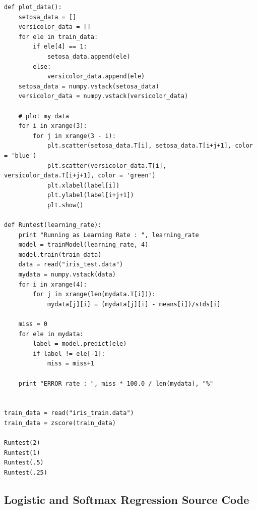 \documentclass{article} %
\begin{document}
\begin{lstlisting}[frame=single]
def plot_data():   
    setosa_data = []
    versicolor_data = []
    for ele in train_data:
        if ele[4] == 1:
            setosa_data.append(ele)
        else:
            versicolor_data.append(ele)
    setosa_data = numpy.vstack(setosa_data)
    versicolor_data = numpy.vstack(versicolor_data)

    # plot my data
    for i in xrange(3):
        for j in xrange(3 - i):
            plt.scatter(setosa_data.T[i], setosa_data.T[i+j+1], color = 'blue')
            plt.scatter(versicolor_data.T[i], versicolor_data.T[i+j+1], color = 'green')
            plt.xlabel(label[i])
            plt.ylabel(label[i+j+1])
            plt.show()

def Runtest(learning_rate):
    print "Running as Learning Rate : ", learning_rate
    model = trainModel(learning_rate, 4)
    model.train(train_data)
    data = read("iris_test.data")
    mydata = numpy.vstack(data)
    for i in xrange(4):
        for j in xrange(len(mydata.T[i])):
            mydata[j][i] = (mydata[j][i] - means[i])/stds[i]
 
    miss = 0
    for ele in mydata:
        label = model.predict(ele)
        if label != ele[-1]:
            miss = miss+1

    print "ERROR rate : ", miss * 100.0 / len(mydata), "%"


train_data = read("iris_train.data")
train_data = zscore(train_data)

Runtest(2)
Runtest(1)
Runtest(.5)
Runtest(.25)

\end{lstlisting}

\subsection{Logistic and Softmax Regression Source Code}
\end{document}
